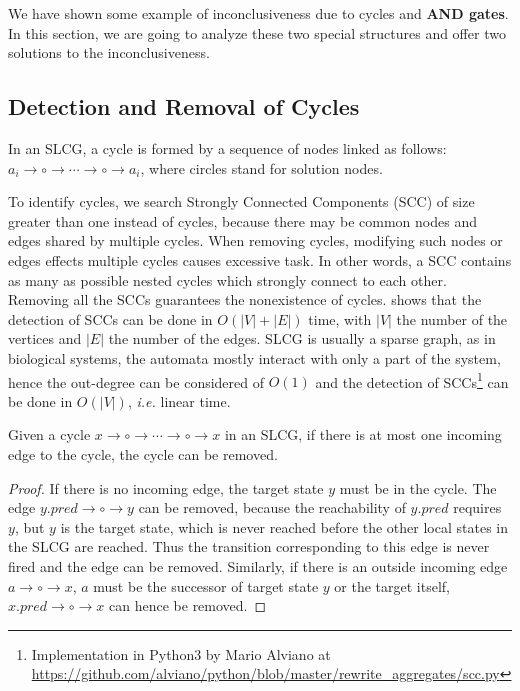 We have shown some example of inconclusiveness due to cycles and \textbf{AND gates}. 
In this section, we are going to analyze these two special structures and offer two solutions to the inconclusiveness.

\subsection{Detection and Removal of Cycles}\label{sec:cycles}
\begin{definition}[Cycle]
In an SLCG, a cycle is formed by a sequence of nodes linked as follows: $a_i\to \circ \to \cdots \to \circ \to a_i$, where circles stand for solution nodes.
\end{definition}

To identify cycles, we search Strongly Connected Components (SCC) of size greater than one instead of cycles, because there may be common nodes and edges shared by multiple cycles.
When removing cycles,  modifying such nodes or edges effects multiple cycles causes excessive task.
In other words, a SCC contains as many as possible nested cycles which strongly connect to each other.
Removing all the SCCs guarantees the nonexistence of cycles.
\cite{tarjan1972} shows that the detection of SCCs can be done in $O (|V|+|E|)$ time, with $|V|$ the number of the vertices and $|E|$ the number of the edges.
SLCG is usually a sparse graph, as in biological systems, the automata mostly interact with only a part of the system, hence the out-degree can be considered of $O (1)$ and the detection of SCCs\footnote{Implementation in Python3 by Mario Alviano at \url{https://github.com/alviano/python/blob/master/rewrite_aggregates/scc.py}} can be done in $O(|V|)$, \textit{i.e.} linear time.

\begin{theorem}\label{th:break_cycle}
Given a cycle $x\to \circ \to \cdots \to \circ \to x$ in an SLCG, if there is at most one incoming edge to the cycle, the cycle can be removed.
\end{theorem}

\begin{proof}
If there is no incoming edge, the target state $y$ must be in the cycle. 
The edge $y.pred\to\circ\to y$ can be removed, because the reachability of $y.pred$ requires $y$, but $y$ is the target state, which is never reached before the other local states in the SLCG are reached.
Thus the transition corresponding to this edge is never fired and the edge can be removed.
Similarly, if there is an outside incoming edge $a\to \circ \to x$, $a$ must be the successor of target state $y$ or the target itself, $x.pred\to\circ\to x$ can hence be removed.
\end{proof}

